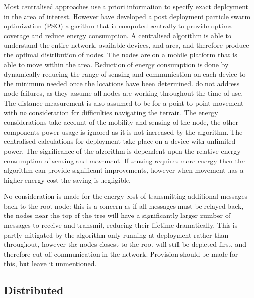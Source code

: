 \documentclass[authoryearcitations]{UoYCSproject}
\begin{document}
%

Most centralised approaches use a priori information to specify exact deployment in the area of interest. However \citet*{Qu2012} have developed a post deployment particle swarm optimization (PSO) algorithm that is computed centrally to provide optimal coverage and reduce energy consumption. A centralised algorithm is able to understand the entire network, available devices, and area, and therefore produce the optimal distribution of nodes. The nodes are on a mobile platform that is able to move within the area. Reduction of energy consumption is done by dynamically reducing the range of sensing and communication on each device to the minimum needed once the locations have been determined. \citeauthor*{Qu2012} do not address node failures, as they assume all nodes are working throughout the time of use. The distance measurement is also assumed to be for a point-to-point movement with no consideration for difficulties navigating the terrain. The energy considerations take account of the mobility and sensing of the node, the other components power usage is ignored as it is not increased by the algorithm. The centralised calculations for deployment take place on a device with unlimited power. The significance of the algorithm is dependent upon the relative energy consumption of sensing and movement. If sensing requires more energy then the algorithm can provide significant improvements, however when movement has a higher energy cost the saving is negligible.

No consideration is made for the energy cost of transmitting additional messages back to the root node: this is a concern as if all messages must be relayed back, the nodes near the top of the tree will have a significantly larger number of messages to receive and transmit, reducing their lifetime dramatically. This is partly mitigated by the algorithm only running at deployment rather than throughout, however the nodes closest to the root will still be depleted first, and therefore cut off communication in the network. Provision should be made for this, but \citeauthor*{Qu2012} leave it unmentioned.

%
%

\subsection{Distributed}
\end{document}
